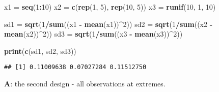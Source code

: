 \documentclass[ignorenonframetext,]{beamer}
\newenvironment{Shaded}{\begin{snugshade}}{\end{snugshade}}
\newcommand{\KeywordTok}[1]{\textcolor[rgb]{0.13,0.29,0.53}{\textbf{#1}}}
\newcommand{\DecValTok}[1]{\textcolor[rgb]{0.00,0.00,0.81}{#1}}
\newcommand{\StringTok}[1]{\textcolor[rgb]{0.31,0.60,0.02}{#1}}
\newcommand{\OperatorTok}[1]{\textcolor[rgb]{0.81,0.36,0.00}{\textbf{#1}}}
\newcommand{\NormalTok}[1]{#1}
\begin{document}
\begin{frame}[fragile]

\begin{Shaded}
\begin{Highlighting}[]
\NormalTok{x1 =}\StringTok{ }\KeywordTok{seq}\NormalTok{(}\DecValTok{1}\OperatorTok{:}\DecValTok{10}\NormalTok{)}
\NormalTok{x2 =}\StringTok{ }\KeywordTok{c}\NormalTok{(}\KeywordTok{rep}\NormalTok{(}\DecValTok{1}\NormalTok{, }\DecValTok{5}\NormalTok{), }\KeywordTok{rep}\NormalTok{(}\DecValTok{10}\NormalTok{, }\DecValTok{5}\NormalTok{))}
\NormalTok{x3 =}\StringTok{ }\KeywordTok{runif}\NormalTok{(}\DecValTok{10}\NormalTok{, }\DecValTok{1}\NormalTok{, }\DecValTok{10}\NormalTok{)}

\NormalTok{sd1 =}\StringTok{ }\KeywordTok{sqrt}\NormalTok{(}\DecValTok{1}\OperatorTok{/}\KeywordTok{sum}\NormalTok{((x1 }\OperatorTok{-}\StringTok{ }\KeywordTok{mean}\NormalTok{(x1))}\OperatorTok{^}\DecValTok{2}\NormalTok{))}
\NormalTok{sd2 =}\StringTok{ }\KeywordTok{sqrt}\NormalTok{(}\DecValTok{1}\OperatorTok{/}\KeywordTok{sum}\NormalTok{((x2 }\OperatorTok{-}\StringTok{ }\KeywordTok{mean}\NormalTok{(x2))}\OperatorTok{^}\DecValTok{2}\NormalTok{))}
\NormalTok{sd3 =}\StringTok{ }\KeywordTok{sqrt}\NormalTok{(}\DecValTok{1}\OperatorTok{/}\KeywordTok{sum}\NormalTok{((x3 }\OperatorTok{-}\StringTok{ }\KeywordTok{mean}\NormalTok{(x3))}\OperatorTok{^}\DecValTok{2}\NormalTok{))}

\KeywordTok{print}\NormalTok{(}\KeywordTok{c}\NormalTok{(sd1, sd2, sd3))}
\end{Highlighting}
\end{Shaded}

\begin{verbatim}
## [1] 0.11009638 0.07027284 0.11512750
\end{verbatim}

\end{frame}

\begin{frame}

\textbf{A}: the second design - all observations at extremes.

\end{frame}
\end{document}
